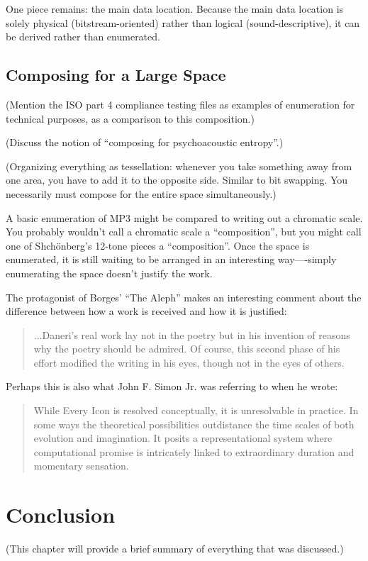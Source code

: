 \documentclass{thesis}
\begin{document}
	One piece remains: the main data location. Because the main data location is solely physical (bitstream-oriented) rather than logical (sound-descriptive), it can be derived rather than enumerated.
	
\section{Composing for a Large Space}

	(Mention the ISO part 4 compliance testing files as examples of enumeration for technical purposes, as a comparison to this composition.)
	
	(Discuss the notion of ``composing for psychoacoustic entropy''.)
	
	(Organizing everything as tessellation: whenever you take something away from one area, you have to add it to the opposite side. Similar to bit swapping. You necessarily must compose for the entire space simultaneously.)
	
	A basic enumeration of MP3 might be compared to writing out a chromatic scale. You probably wouldn't call a chromatic scale a ``composition'', but you might call one of Shch\"onberg's 12-tone pieces a ``composition''. Once the space is enumerated, it is still waiting to be arranged in an interesting way----simply enumerating the space doesn't justify the work.

	The protagonist of Borges' ``The Aleph'' makes an interesting comment about the difference between how a work is received and how it is justified:
	
	\begin{quote}
	...Daneri's real work lay not in the poetry but in his invention of reasons why the poetry should be admired. Of course, this second phase of his effort modified the writing in his eyes, though not in the eyes of others.
	\end{quote}
	
	Perhaps this is also what John F. Simon Jr. was referring to when he wrote:
	
	\begin{quote}
	While Every Icon is resolved conceptually, it is unresolvable in practice. In some ways the theoretical possibilities outdistance the time scales of both evolution and imagination. It posits a representational system where computational promise is intricately linked to extraordinary duration and momentary sensation.\cite{john_f._simon_jr._given:32_1997}
	\end{quote}
	
\chapter{Conclusion}
	(This chapter will provide a brief summary of everything that was discussed.)

\begin{singlespace}


\end{singlespace}
\end{document}
